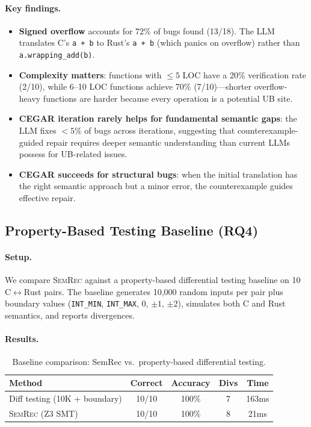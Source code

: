 \documentclass[11pt,a4paper]{article}
\begin{document}
\paragraph{Key findings.}
\begin{itemize}
  \item \textbf{Signed overflow} accounts for 72\% of bugs found (13/18).
    The LLM translates C's \texttt{a + b} to Rust's \texttt{a + b}
    (which panics on overflow) rather than \texttt{a.wrapping\_add(b)}.
  \item \textbf{Complexity matters}: functions with $\leq 5$ LOC have a
    20\% verification rate (2/10), while 6--10 LOC functions achieve 70\%
    (7/10)---shorter overflow-heavy functions are harder because every
    operation is a potential UB site.
  \item \textbf{CEGAR iteration rarely helps for fundamental semantic gaps}:
    the LLM fixes $<5\%$ of bugs across iterations, suggesting that
    counterexample-guided repair requires deeper semantic understanding
    than current LLMs possess for UB-related issues.
  \item \textbf{CEGAR succeeds for structural bugs}: when the initial
    translation has the right semantic approach but a minor error,
    the counterexample guides effective repair.
\end{itemize}

\subsection{Property-Based Testing Baseline (RQ4)}\label{sec:eval-pbt}

\paragraph{Setup.}
We compare \textsc{SemRec} against a property-based differential testing
baseline on 10 C$\leftrightarrow$Rust pairs.  The baseline generates 10,000
random inputs per pair plus boundary values (\texttt{INT\_MIN},
\texttt{INT\_MAX}, $0$, $\pm 1$, $\pm 2$), simulates both C and Rust
semantics, and reports divergences.

\paragraph{Results.}

\begin{table}[t]
\centering
\small
\caption{Baseline comparison: SemRec vs.\ property-based differential testing.}
\label{tab:pbt-baseline}
\begin{tabular}{@{}lcccc@{}}
\toprule
Method & Correct & Accuracy & Divs & Time \\
\midrule
Diff testing (10K + boundary) & 10/10 & 100\% & 7 & 163ms \\
\textsc{SemRec} (Z3 SMT) & 10/10 & 100\% & 8 & 21ms \\
\bottomrule
\end{tabular}
\end{table}
\end{document}

